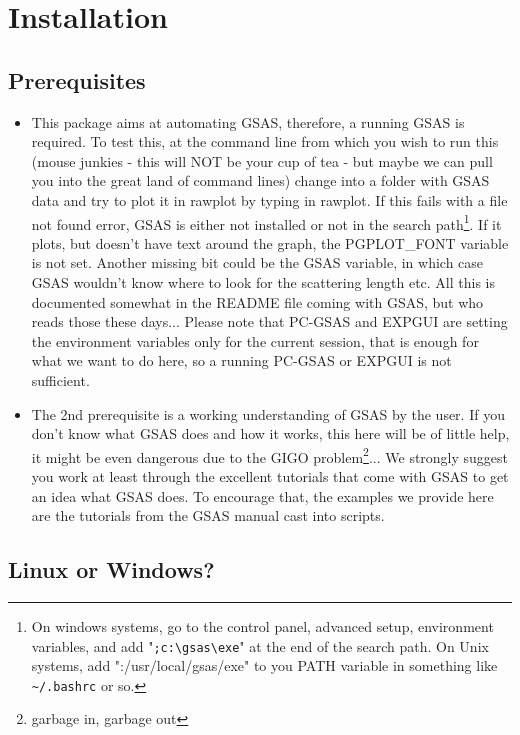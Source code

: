 \chapter{Installation}

\section{Prerequisites}

\begin{itemize}
\item This package aims at automating GSAS, therefore, a running GSAS is required. To test this, at the command line from which you wish to run this (mouse junkies - this will NOT be your cup of tea - but maybe we can pull you into the great land of command lines) change into a folder with GSAS data and try to plot it in rawplot by typing in rawplot. If this fails with a file not found error, GSAS is either not installed or not in the search path\footnote{On windows systems, go to the control panel, advanced setup, environment variables, and add "\texttt{;c:\textbackslash gsas\textbackslash exe}" at the end of the search path. On Unix systems, add ":/usr/local/gsas/exe" to you PATH variable in something like \texttt{\textasciitilde/.bashrc} or so.}. If it plots, but doesn't have text around the graph, the PGPLOT\_FONT variable is not set. Another missing bit could be the GSAS variable, in which case GSAS wouldn't know where to look for the scattering length etc. All this is documented somewhat in the README file coming with GSAS, but who reads those these days... Please note that PC-GSAS and EXPGUI are setting the environment variables only for the current session, that is enough for what we want to do here, so a running PC-GSAS or EXPGUI is not sufficient.
\item The 2nd prerequisite is a working understanding of GSAS by the user. If you don't know what GSAS does and how it works, this here will be of little help, it might be even dangerous due to the GIGO problem\footnote{garbage in, garbage out}... We strongly suggest you work at least through the excellent tutorials that come with GSAS to get an idea what GSAS does. To encourage that, the examples we provide here are the tutorials from the GSAS manual cast into scripts.
\end{itemize}

\section{Linux or Windows?}

